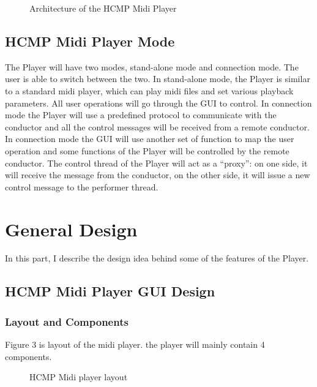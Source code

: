 \documentclass[12pt]{article} %
\begin{document}
\begin{figure}[H] %
\caption{Architecture of the HCMP Midi Player}
\label{fig:speciation}
\end{figure}

\subsection{HCMP Midi Player Mode} %
The Player will have two modes, stand-alone
mode and connection mode. The user is able to switch between the two. In stand-alone mode, 
the Player is similar to a standard midi player, which can play midi  
files and set various playback parameters. All user operations will go through the GUI to control. 
In connection mode the Player will use a predefined protocol to communicate with the conductor and all the 
control messages will be received from a remote conductor. In connection mode the GUI will use another 
set of function to map the user operation and some functions of the Player will be controlled by the 
remote conductor. The control thread 
of the Player will act as a ``proxy'': on one side, 
it will receive the message from the conductor, on the other side, it will issue a new control message
to the performer thread.


\section{General Design} %

In this part, I describe the design idea behind some of the features of the Player. 

\subsection{HCMP Midi Player GUI Design} %

\subsubsection{Layout and Components}
Figure 3 is layout of the midi player. the player will mainly contain 4 components. 

\begin{figure}[H] %
\caption{HCMP Midi player layout}
\label{fig:speciation}
\end{figure}
\end{document}
